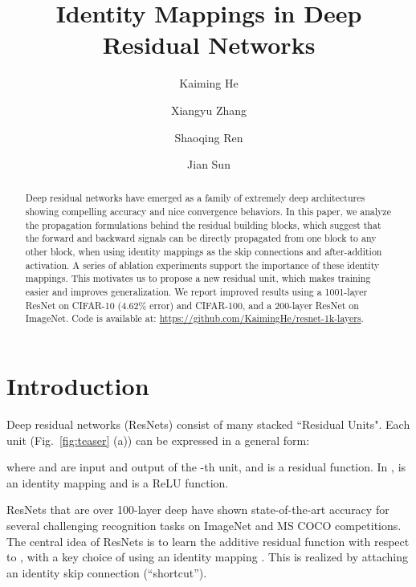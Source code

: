 \documentclass[runningheads]{llncs}
\begin{document}
\pagestyle{headings}
\mainmatter

\title{Identity Mappings in Deep Residual Networks}

\titlerunning{~}

\authorrunning{~}

\author{Kaiming He \and Xiangyu Zhang \and Shaoqing Ren \and Jian Sun}


\maketitle

\begin{abstract}
Deep residual networks \cite{He2016} have emerged as a family of extremely deep architectures showing compelling accuracy and nice convergence behaviors. In this paper, we analyze the propagation formulations behind the residual building blocks, which suggest that the forward and backward signals can be directly propagated from one block to any other block, when using identity mappings as the skip connections and after-addition activation. A series of ablation experiments support the importance of these identity mappings. This motivates us to propose a new residual unit, which makes training easier and improves generalization. We report improved results using a 1001-layer ResNet on CIFAR-10 (4.62\% error) and CIFAR-100,  and a 200-layer ResNet on ImageNet. Code is available at: \url{https://github.com/KaimingHe/resnet-1k-layers}.
\end{abstract}


\hypersetup{urlcolor=black}

\section{Introduction}
Deep residual networks (ResNets) \cite{He2016} consist of many stacked ``Residual Units". Each unit (Fig.~\ref{fig:teaser} (a)) can be expressed in a general form:

where  and  are input and output of the -th unit, and  is a residual function. In \cite{He2016},  is an identity mapping and  is a ReLU \cite{Nair2010} function.

ResNets that are over 100-layer deep have shown state-of-the-art accuracy for several challenging recognition tasks on ImageNet \cite{Russakovsky2015} and MS COCO \cite{Lin2014} competitions. The central idea of ResNets is to learn the additive residual function  with respect to , with a key choice of using an identity mapping . This is realized by attaching an identity skip connection (``shortcut'').
\end{document}
